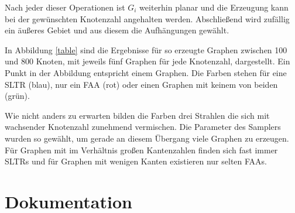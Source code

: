 Nach jeder dieser Operationen ist $G_i$ weiterhin planar und die Erzeugung kann bei der gewünschten Knotenzahl angehalten werden. Abschließend wird zufällig ein äußeres Gebiet und aus diesem die Aufhängungen gewählt.

In Abbildung \ref{table} sind die Ergebnisse für so erzeugte Graphen zwischen 100 und 800 Knoten, mit jeweils fünf Graphen für jede Knotenzahl, dargestellt. Ein Punkt in der Abbildung entspricht einem Graphen. Die Farben stehen für eine SLTR (blau), nur ein FAA (rot) oder einen Graphen mit keinem von beiden (grün). 



Wie nicht anders zu erwarten bilden die Farben drei Strahlen die sich mit wachsender Knotenzahl zunehmend vermischen. Die Parameter des Samplers wurden so gewählt, um gerade an diesem Übergang viele Graphen zu erzeugen. Für Graphen mit im Verhältnis großen Kantenzahlen finden sich fast immer SLTRs und für Graphen mit wenigen Kanten existieren nur selten FAAs.

\section{Dokumentation}


